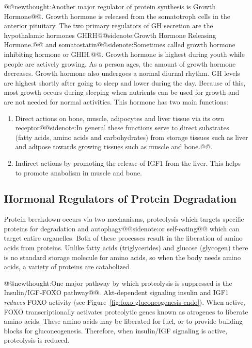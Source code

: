 \documentclass{tufte-handout}
\makeatletter
\def\newthought#1{@@newthought:#1@@}
\def\sidenote#1{@@sidenote:#1@@}
\makeatother
\begin{document}
\newthought{Another major regulator of protein synthesis is Growth Hormone}.  Growth hormone is released from the somatotroph cells in the anterior pituitary.  The two primary regulators of GH secretion are the hypothalamic hormones GHRH\sidenote{Growth Hormone Releasing Hormone.} and somatostatin\sidenote{Sometimes called growth hormone inhibiting hormone or GHIH.}.  Growth hormone is highest during youth while people are actively growing.  As a person ages, the amount of growth hormone decreases.  Growth hormone also undergoes a normal diurnal rhythm.  GH levels are highest shortly after going to sleep and lower during the day.  Because of this, most growth occurs during sleeping when nutrients can be used for growth and are not needed for normal activities.  This hormone has two main functions:
\begin{enumerate}
\item Direct actions on bone, muscle, adipocytes and liver tissue via its own receptor\sidenote{In general these functions serve to direct substrates (fatty acids, amino acids and carbohydrates) from storage tissues such as liver and adipose towards growing tissues such as muscle and bone.}.
\item Indirect actions by promoting the release of IGF1 from the liver.  This helps to promote anabolism in muscle and bone.
\end{enumerate}

\subsection{Hormonal Regulators of Protein Degradation}
Protein breakdown occurs via two mechanisms, proteolysis which targets specific proteins for degradation and autophagy\sidenote{or self-eating} which can target entire organelles.  Both of these processes result in the liberation of amino acids from proteins.  Unlike fatty acids (triglycerides) and glucose (glycogen) there is no standard storage molecule for amino acids, so when the body needs amino acids, a variety of proteins are catabolized. 

\newthought{One major pathway by which proteolysis is suppressed is the Insulin/IGF-FOXO pathway}.  Akt-dependent signaling insulin and IGF1 \emph{reduces} FOXO activity (see Figure~\ref{fig:foxo-gluconeogenesis-endo}).  When active, FOXO transcriptionally activates proteolytic genes known as atrogenes to liberate amino acids.  These amino acids may be liberated for fuel, or to provide building blocks for gluconeogenesis.  Therefore, when insulin/IGF signaling is active, proteolysis is reduced. 
\end{document}
